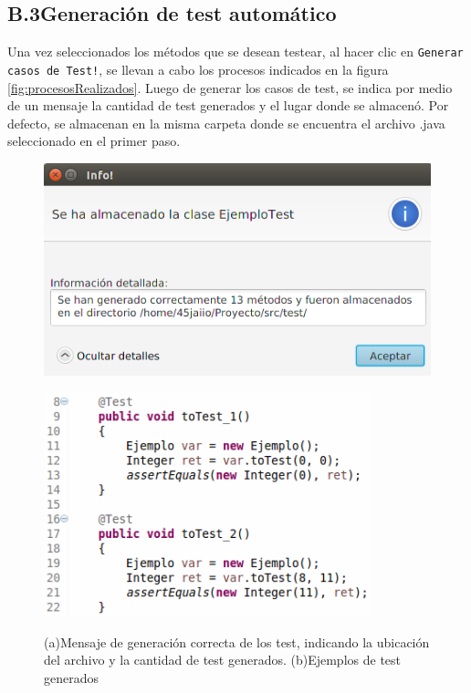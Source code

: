 \documentclass{llncs}
\begin{document}
    \subsection*{B.3\enspace Generación de test automático}
    Una vez seleccionados los métodos que se desean testear, al hacer clic en \texttt{Generar casos de Test!}, se llevan a cabo los procesos indicados en la figura
    \ref{fig:procesosRealizados}. Luego de generar los casos de test, se indica por medio de un mensaje la cantidad de test generados y el lugar donde se almacenó.
    Por defecto, se almacenan en la misma carpeta donde se encuentra el archivo .java seleccionado en el primer paso.
    \begin{figure}[hbt!]
     \centering
      \begin{minipage}[H]{0.45\textwidth}
      \centering
      \includegraphics[width=1\textwidth]{screenshots/3-generados}
    \end{minipage}
    \centering
    \begin{minipage}[H]{0.45\textwidth}
      \centering
      \includegraphics[width=0.85\textwidth]{screenshots/EjemploTestGen}\\
    \end{minipage}
    \caption{(a)Mensaje de generación correcta de los test, indicando la ubicación del archivo y la cantidad de test generados. (b)Ejemplos de test generados}
    \label{cicloInf}
    \end{figure}
    
\end{document}
